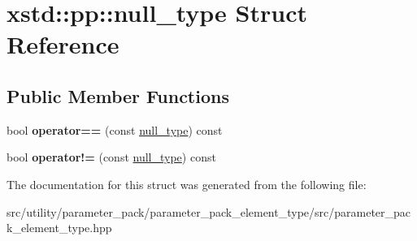 \hypertarget{structxstd_1_1pp_1_1null__type}{\section{xstd\-:\-:pp\-:\-:null\-\_\-type Struct Reference}
\label{structxstd_1_1pp_1_1null__type}
}
\subsection*{Public Member Functions}
\begin{DoxyCompactItemize}
\item 
\hypertarget{structxstd_1_1pp_1_1null__type_ab9e5487aa630bf4bfd0b01c28cc0415e}{bool {\bfseries operator==} (const \hyperlink{structxstd_1_1pp_1_1null__type}{null\-\_\-type}) const }\label{structxstd_1_1pp_1_1null__type_ab9e5487aa630bf4bfd0b01c28cc0415e}

\item 
\hypertarget{structxstd_1_1pp_1_1null__type_ab290a23fbfc450daa1db57bfea446268}{bool {\bfseries operator!=} (const \hyperlink{structxstd_1_1pp_1_1null__type}{null\-\_\-type}) const }\label{structxstd_1_1pp_1_1null__type_ab290a23fbfc450daa1db57bfea446268}

\end{DoxyCompactItemize}


The documentation for this struct was generated from the following file\-:\begin{DoxyCompactItemize}
\item 
src/utility/parameter\-\_\-pack/parameter\-\_\-pack\-\_\-element\-\_\-type/src/parameter\-\_\-pack\-\_\-element\-\_\-type.\-hpp\end{DoxyCompactItemize}
